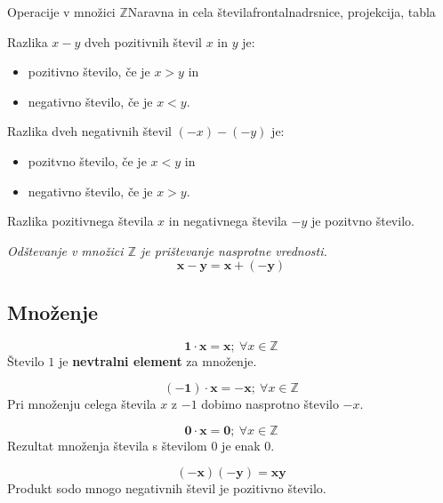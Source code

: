\begin{priprava}{4}{}{Operacije v množici $\mathbb{Z}$}{Naravna in cela števila}{frontalna}{drsnice, projekcija, tabla}
     \begin{multicols}{2}
        Razlika $x-y$ dveh pozitivnih števil $x$ in $y$ je:
        \begin{itemize}
            \item pozitivno število, če je $x>y$ in 
            \item negativno število, če je $x<y$.
        \end{itemize}

        
     
        Razlika dveh negativnih števil $(-x)-(-y)$ je:
        \begin{itemize}
            \item pozitvno število, če je $x<y$ in 
            \item negativno število, če je $x>y$.
        \end{itemize}

    \end{multicols}
     
        Razlika pozitivnega števila $x$ in negativnega števila $-y$ je pozitvno število.
        ~\newline


    
        \textit{Odštevanje v množici $\mathbb{Z}$ je prištevanje nasprotne vrednosti.}
        $$\mathbf{x-y=x+(-y)} $$
    
 

 
    \subsection{Množenje}

    \begin{multicols}{2}

        $$\mathbf{1\cdot x=x}; ~\forall x\in\mathbb{Z}$$
        Število $1$ je \textbf{nevtralni element} za množenje.
     

     
        $$\mathbf{(-1)\cdot x=-x}; ~\forall x\in\mathbb{Z}$$
        Pri množenju celega števila $x$ z $-1$ dobimo nasprotno število $-x$.
     

     
        $$\mathbf{0\cdot x=0}; ~\forall x\in\mathbb{Z}$$
        Rezultat množenja števila s številom $0$ je enak $0$.
     

 

 


     
        $$\mathbf{(-x)(-y)=xy}$$
        Produkt sodo mnogo negativnih števil je pozitivno število.
     


\end{multicols}
\end{priprava}
